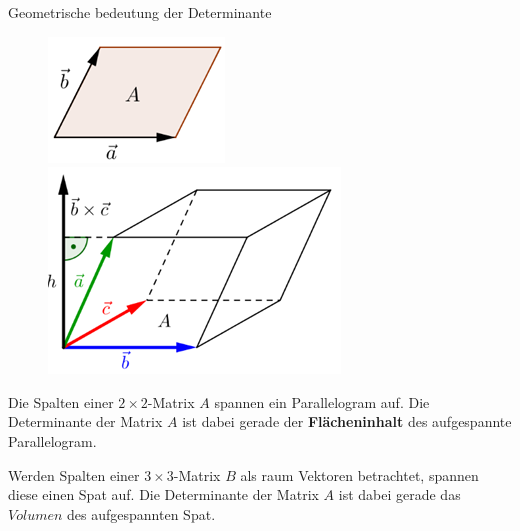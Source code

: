     \begin{theorem}{Geometrische bedeutung der Determinante}


        \begin{figure}
            \vspace{-10pt}
            \includegraphics[width=0.9\linewidth]{det-vis-2d.png}
            \includegraphics[width=0.9\linewidth]{det-vis-3d.png}
        \end{figure}
        Die Spalten einer $2\times 2$-Matrix $A$ spannen ein Parallelogram auf.
        Die Determinante der Matrix $A$ ist dabei gerade der \textbf{Flächeninhalt} des aufgespannte Parallelogram.
        \vspace{1.25em}

        Werden Spalten einer $3\times 3$-Matrix $B$ als raum Vektoren betrachtet, 
        spannen diese einen Spat auf.
        Die Determinante der Matrix $A$ ist dabei gerade das $Volumen$ des aufgespannten Spat.
        \vspace{1em}
    \end{theorem}
    

